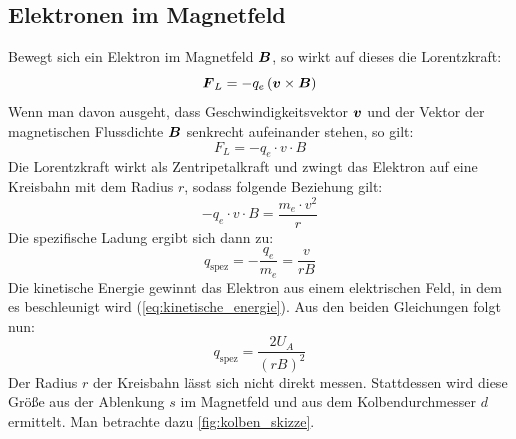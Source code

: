 \documentclass[ngerman]{scrartcl}
\begin{document}
\subsection[Elektronen im Magnetfeld]{Elektronen im Magnetfeld \cite{ref:angabe_elektronen}}
\label{subsec:grundlagen_elektronen_im_magnetfeld}
%
Bewegt sich ein Elektron im Magnetfeld $\vb*{B}$, so wirkt auf dieses die Lorentzkraft:
%
\begin{equation}
    \label{eq:lorentzkraft}
    \vb*{F}_L = - q_e \left(\vb*{v} \times \vb*{B} \right)
\end{equation}
%
Wenn man davon ausgeht, dass Geschwindigkeitsvektor $\vb*{v}$ und der Vektor der magnetischen Flussdichte $\vb*{B}$ senkrecht aufeinander stehen, so gilt:
\begin{equation}
    \label{eq:lorentzkraft_orthogonal}
    F_L = -q_e \cdot v \cdot B
\end{equation}
%
Die Lorentzkraft wirkt als Zentripetalkraft und zwingt das Elektron auf eine Kreisbahn mit dem Radius $r$, sodass folgende Beziehung gilt:
\[-q_e \cdot v \cdot B = \frac{m_e \cdot v^2}{r}\]
Die spezifische Ladung ergibt sich dann zu:
\begin{equation}
    \label{eq:spezifische_ladung}
    q_{\text{spez}} = - \frac{q_e}{m_e} = \frac{v}{rB}
\end{equation}
Die kinetische Energie gewinnt das Elektron aus einem elektrischen Feld, in dem es beschleunigt wird (\autoref{eq:kinetische_energie}). Aus den beiden Gleichungen folgt nun:
\begin{equation}
    \label{eq:spezifische_ladung_U}
    q_{\text{spez}} = \frac{2 U_A}{(rB)^2}
\end{equation}
Der Radius $r$ der Kreisbahn lässt sich nicht direkt messen. Stattdessen wird diese Größe aus der Ablenkung $s$ im Magnetfeld und aus dem Kolbendurchmesser $d$ ermittelt. Man betrachte dazu \autoref{fig:kolben_skizze}.
%
\setcapindent{0pt}
\end{document}
